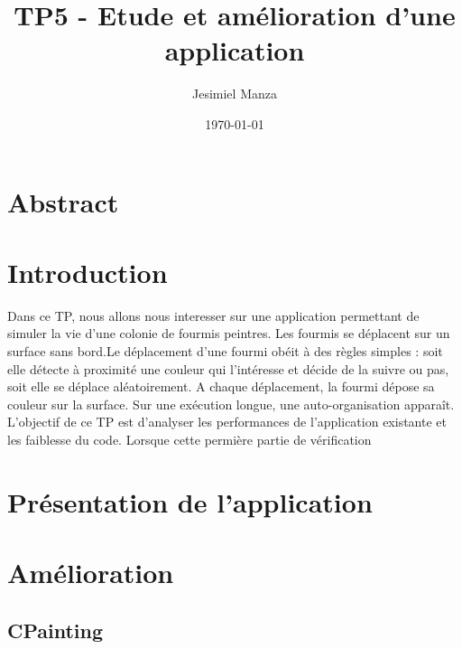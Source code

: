 \documentclass[a4paper,12pt]{article}
\title{TP5 - Etude et amélioration d’une application}
\author{Jesimiel Manza}
\date{\today}
\begin{document}
\maketitle

\section*{Abstract}

\section{Introduction}
Dans ce TP, nous allons nous interesser sur une application permettant de simuler la vie d'une colonie de fourmis peintres. Les fourmis se déplacent sur un surface sans bord.Le déplacement d’une fourmi obéit à des règles simples : soit elle détecte à proximité une couleur qui l’intéresse et décide de la suivre ou pas, soit elle se déplace aléatoirement. A chaque déplacement, la fourmi dépose sa couleur sur la surface. Sur une exécution longue, une auto-organisation apparaît. 
L'objectif de ce TP est d'analyser les performances de l'application existante et les faiblesse du code. Lorsque cette permière partie de vérification 

\section{Présentation de l'application}

\section{Amélioration}

\subsection{CPainting}
\end{document}
